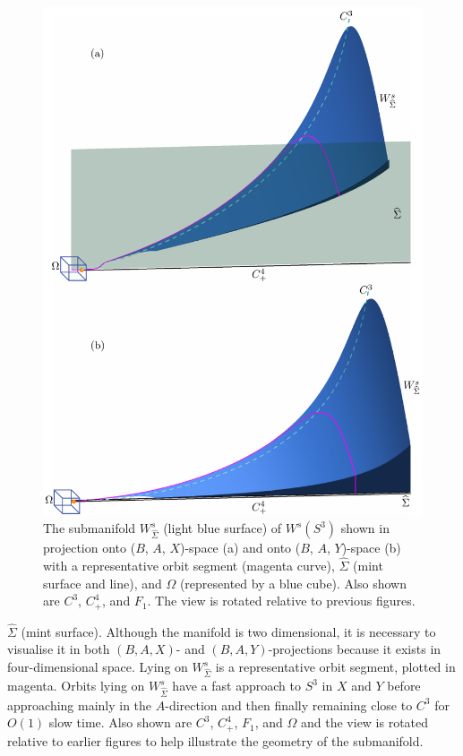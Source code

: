 \documentclass{ws-ijbc}
\begin{document}
\begin{figure}[H]
\centering
\includegraphics[]{./figures/MKMO_4.pdf}
\caption{The submanifold $W^{s}_{\widehat{\Sigma}}$ (light blue surface) of $W^s(S^3)$ shown in projection onto ($B$, $A$, $X$)-space (a) and onto ($B$, $A$, $Y$)-space (b) with a representative orbit segment (magenta curve), $\widehat{\Sigma}$ (mint surface and line), and $\Omega$ (represented by a blue cube).  Also shown are $C^3$, $C^4_+$, and $F_1$.  The view is rotated relative to previous figures.}
\label{figure_4}
\end{figure}

\noindent
$\widehat{\Sigma}$ (mint surface).  Although the manifold is two dimensional, it is necessary to visualise it in both $(B,A,X)$- and $(B,A,Y)$-projections because it exists in four-dimensional space.  Lying on $W^s_{\widehat{\Sigma}}$ is a representative orbit segment, plotted in magenta.  Orbits lying on $W^s_{\widehat{\Sigma}}$ have a fast approach to $S^3$ in $X$ and $Y$ before approaching mainly in the $A$-direction and then finally remaining close to $C^3$ for $O(1)$ slow time.  Also shown are $C^3$, $C^4_+$, $F_1$, and $\Omega$ and the view is rotated relative to earlier figures to help illustrate the geometry of the submanifold.
\end{document}
